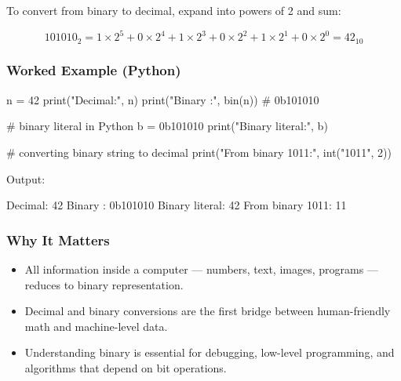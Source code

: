 \documentclass[
  letterpaper,
  DIV=11,
  numbers=noendperiod]{scrreprt}
\newenvironment{Shaded}{\begin{snugshade}}{\end{snugshade}}
\newcommand{\BaseNTok}[1]{\textcolor[rgb]{0.68,0.00,0.00}{#1}}
\newcommand{\BuiltInTok}[1]{\textcolor[rgb]{0.00,0.23,0.31}{#1}}
\newcommand{\CommentTok}[1]{\textcolor[rgb]{0.37,0.37,0.37}{#1}}
\newcommand{\DecValTok}[1]{\textcolor[rgb]{0.68,0.00,0.00}{#1}}
\newcommand{\ExtensionTok}[1]{\textcolor[rgb]{0.00,0.23,0.31}{#1}}
\newcommand{\NormalTok}[1]{\textcolor[rgb]{0.00,0.23,0.31}{#1}}
\newcommand{\OperatorTok}[1]{\textcolor[rgb]{0.37,0.37,0.37}{#1}}
\newcommand{\StringTok}[1]{\textcolor[rgb]{0.13,0.47,0.30}{#1}}
\providecommand{\tightlist}{%
  \setlength{\itemsep}{0pt}\setlength{\parskip}{0pt}}
\begin{document}
To convert from binary to decimal, expand into powers of 2 and sum:

\[
101010_2 = 1 \times 2^5 + 0 \times 2^4 + 1 \times 2^3 + 0 \times 2^2 + 1 \times 2^1 + 0 \times 2^0 = 42_{10}
\]

\subsubsection{Worked Example (Python)}\label{worked-example-python}

\begin{Shaded}
\begin{Highlighting}[]
\NormalTok{n }\OperatorTok{=} \DecValTok{42}
\BuiltInTok{print}\NormalTok{(}\StringTok{"Decimal:"}\NormalTok{, n)}
\BuiltInTok{print}\NormalTok{(}\StringTok{"Binary :"}\NormalTok{, }\BuiltInTok{bin}\NormalTok{(n))   }\CommentTok{\# 0b101010}

\CommentTok{\# binary literal in Python}
\NormalTok{b }\OperatorTok{=} \BaseNTok{0b101010}
\BuiltInTok{print}\NormalTok{(}\StringTok{"Binary literal:"}\NormalTok{, b)}

\CommentTok{\# converting binary string to decimal}
\BuiltInTok{print}\NormalTok{(}\StringTok{"From binary \textquotesingle{}1011\textquotesingle{}:"}\NormalTok{, }\BuiltInTok{int}\NormalTok{(}\StringTok{"1011"}\NormalTok{, }\DecValTok{2}\NormalTok{))}
\end{Highlighting}
\end{Shaded}

Output:

\begin{Shaded}
\begin{Highlighting}[]
\ExtensionTok{Decimal:}\NormalTok{ 42}
\ExtensionTok{Binary}\NormalTok{ : 0b101010}
\ExtensionTok{Binary}\NormalTok{ literal: 42}
\ExtensionTok{From}\NormalTok{ binary }\StringTok{\textquotesingle{}1011\textquotesingle{}}\NormalTok{: 11}
\end{Highlighting}
\end{Shaded}

\subsubsection{Why It Matters}\label{why-it-matters}

\begin{itemize}
\tightlist
\item
  All information inside a computer --- numbers, text, images, programs
  --- reduces to binary representation.
\item
  Decimal and binary conversions are the first bridge between
  human-friendly math and machine-level data.
\item
  Understanding binary is essential for debugging, low-level
  programming, and algorithms that depend on bit operations.
\end{itemize}
\end{document}
